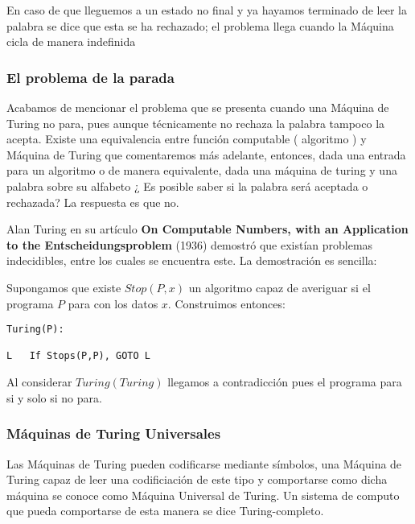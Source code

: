  \vspace{10px}
 
 En caso de que lleguemos a un estado no final y ya hayamos terminado de leer la palabra se dice que esta se ha rechazado; el problema llega cuando la Máquina cicla de manera indefinida


\subsubsection{El problema de la parada}


Acabamos de mencionar el problema que se presenta cuando una Máquina de Turing no para, pues aunque técnicamente no rechaza la palabra tampoco la acepta. Existe una equivalencia entre función computable ( algoritmo ) y Máquina de Turing que comentaremos más adelante, entonces, dada una entrada para un algoritmo o de manera equivalente, dada una máquina de turing y una palabra sobre su alfabeto ¿ Es posible saber si la palabra será aceptada o rechazada? La respuesta es que no.

\vspace{10px}

Alan Turing en su artículo \textbf{On Computable Numbers, with an Application to the Entscheidungsproblem} (1936) demostró que existían problemas indecidibles, entre los cuales se encuentra este. La demostración es sencilla:

\vspace{10px}

Supongamos que existe $Stop(P,x)$ un algoritmo capaz de averiguar si el programa $P$ para con los datos $x$. Construimos entonces:

\begin{lstlisting}
Turing(P):

L	If Stops(P,P), GOTO L
\end{lstlisting}

\vspace{0.5cm}

Al considerar $Turing(Turing)$ llegamos a contradicción pues el programa para si y solo si no para.

\subsubsection{Máquinas de Turing Universales}

Las Máquinas de Turing pueden codificarse mediante símbolos, una Máquina de Turing capaz de leer una codificiación de este tipo y comportarse como dicha máquina se conoce como Máquina Universal de Turing. Un sistema de computo que pueda comportarse de esta manera se dice Turing-completo.

